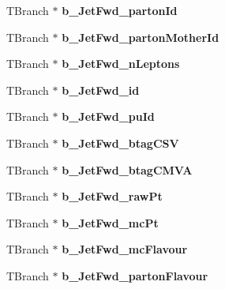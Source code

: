 \begin{DoxyCompactItemize}
\hypertarget{classMiniTree_ad73917970383d10b706b66e594a805c6}{}\label{classMiniTree_ad73917970383d10b706b66e594a805c6} 
T\+Branch $\ast$ {\bfseries b\+\_\+\+Jet\+Fwd\+\_\+parton\+Id}
\item 
\hypertarget{classMiniTree_a390441adedbac7569420d5f897bda57b}{}\label{classMiniTree_a390441adedbac7569420d5f897bda57b} 
T\+Branch $\ast$ {\bfseries b\+\_\+\+Jet\+Fwd\+\_\+parton\+Mother\+Id}
\item 
\hypertarget{classMiniTree_af5b0882552bc6c2228732ebe6b80cff5}{}\label{classMiniTree_af5b0882552bc6c2228732ebe6b80cff5} 
T\+Branch $\ast$ {\bfseries b\+\_\+\+Jet\+Fwd\+\_\+n\+Leptons}
\item 
\hypertarget{classMiniTree_a10bc073059d567387fcf3a2410f543d4}{}\label{classMiniTree_a10bc073059d567387fcf3a2410f543d4} 
T\+Branch $\ast$ {\bfseries b\+\_\+\+Jet\+Fwd\+\_\+id}
\item 
\hypertarget{classMiniTree_a40d1f11185423afa1b78ed50e83de97c}{}\label{classMiniTree_a40d1f11185423afa1b78ed50e83de97c} 
T\+Branch $\ast$ {\bfseries b\+\_\+\+Jet\+Fwd\+\_\+pu\+Id}
\item 
\hypertarget{classMiniTree_acb9daacd4638f85013314c7e643ee36f}{}\label{classMiniTree_acb9daacd4638f85013314c7e643ee36f} 
T\+Branch $\ast$ {\bfseries b\+\_\+\+Jet\+Fwd\+\_\+btag\+C\+SV}
\item 
\hypertarget{classMiniTree_adf0e899ca04063936e3593145a4f03d0}{}\label{classMiniTree_adf0e899ca04063936e3593145a4f03d0} 
T\+Branch $\ast$ {\bfseries b\+\_\+\+Jet\+Fwd\+\_\+btag\+C\+M\+VA}
\item 
\hypertarget{classMiniTree_aaa6f01283bb3a377c494deca0ce2a50d}{}\label{classMiniTree_aaa6f01283bb3a377c494deca0ce2a50d} 
T\+Branch $\ast$ {\bfseries b\+\_\+\+Jet\+Fwd\+\_\+raw\+Pt}
\item 
\hypertarget{classMiniTree_ab34facbd35edfdeb7060c2462541ad43}{}\label{classMiniTree_ab34facbd35edfdeb7060c2462541ad43} 
T\+Branch $\ast$ {\bfseries b\+\_\+\+Jet\+Fwd\+\_\+mc\+Pt}
\item 
\hypertarget{classMiniTree_a4e3a87936642a12fc0c788fb4600b8df}{}\label{classMiniTree_a4e3a87936642a12fc0c788fb4600b8df} 
T\+Branch $\ast$ {\bfseries b\+\_\+\+Jet\+Fwd\+\_\+mc\+Flavour}
\item 
\hypertarget{classMiniTree_aba31b38bc903060d6909b7b5e36d2266}{}\label{classMiniTree_aba31b38bc903060d6909b7b5e36d2266} 
T\+Branch $\ast$ {\bfseries b\+\_\+\+Jet\+Fwd\+\_\+parton\+Flavour}
\item 
\hypertarget{classMiniTree_a9c6170ee2a90c9e19a2e63654aee6932}{}\label{classMiniTree_a9c6170ee2a90c9e19a2e63654aee6932} 

\end{DoxyCompactItemize}
